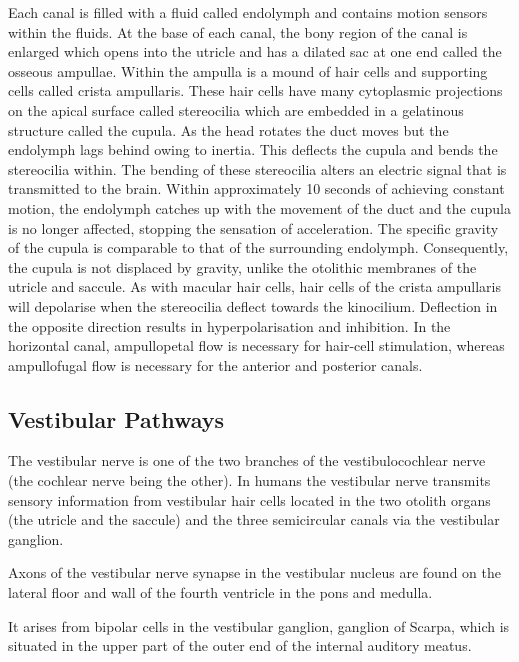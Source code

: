 Each canal is filled with a fluid called endolymph and contains motion sensors within the fluids. At the base of each canal, the bony region of the canal is enlarged which opens into the utricle and has a dilated sac at one end called the osseous ampullae. Within the ampulla is a mound of hair cells and supporting cells called crista ampullaris. These hair cells have many cytoplasmic projections on the apical surface called stereocilia which are embedded in a gelatinous structure called the cupula. As the head rotates the duct moves but the endolymph lags behind owing to inertia. This deflects the cupula and bends the stereocilia within. The bending of these stereocilia alters an electric signal that is transmitted to the brain. Within approximately 10 seconds of achieving constant motion, the endolymph catches up with the movement of the duct and the cupula is no longer affected, stopping the sensation of acceleration. The specific gravity of the cupula is comparable to that of the surrounding endolymph. Consequently, the cupula is not displaced by gravity, unlike the otolithic membranes of the utricle and saccule. As with macular hair cells, hair cells of the crista ampullaris will depolarise when the stereocilia deflect towards the kinocilium. Deflection in the opposite direction results in hyperpolarisation and inhibition. In the horizontal canal, ampullopetal flow is necessary for hair-cell stimulation, whereas ampullofugal flow is necessary for the anterior and posterior canals.

\hypertarget{vestibular-pathways}{%
\subsection{Vestibular Pathways}\label{vestibular-pathways}}

The vestibular nerve is one of the two branches of the vestibulocochlear nerve (the cochlear nerve being the other). In humans the vestibular nerve transmits sensory information from vestibular hair cells located in the two otolith organs (the utricle and the saccule) and the three semicircular canals via the vestibular ganglion.

Axons of the vestibular nerve synapse in the vestibular nucleus are found on the lateral floor and wall of the fourth ventricle in the pons and medulla.

It arises from bipolar cells in the vestibular ganglion, ganglion of Scarpa, which is situated in the upper part of the outer end of the internal auditory meatus.

